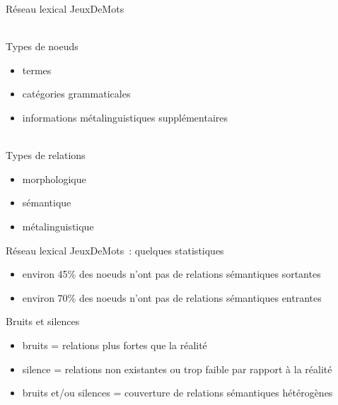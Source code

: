 \documentclass{beamer}
\begin{document}
\begin{frame}
\begin{center}
  Réseau lexical JeuxDeMots  \\\
  \end{center}

Types de noeuds
  \begin{itemize}
  \item termes
  \item catégories grammaticales
  \item informations métalinguistiques supplémentaires 
  \end{itemize}

  \textcolor{white}{text}\\
  Types de relations 
  \begin{itemize}
  \item morphologique
  \item sémantique
  \item métalinguistique
  \end{itemize}
  
\end{frame}

\begin{frame}
  Réseau lexical JeuxDeMots~: quelques statistiques
  \begin{itemize}
  \item environ 45\% des noeuds n'ont pas de relations sémantiques sortantes
  \item environ 70\% des noeuds n'ont pas de relations sémantiques entrantes
  \end{itemize}
\end{frame}

\begin{frame}
  Bruits et silences
  \begin{itemize}
  \item bruits = relations plus fortes que la réalité 
  \item silence = relations non existantes ou trop faible par rapport à la réalité 
  \item bruits et/ou silences = couverture de relations sémantiques hétérogènes
  \end{itemize}
\end{frame}
\end{document}
